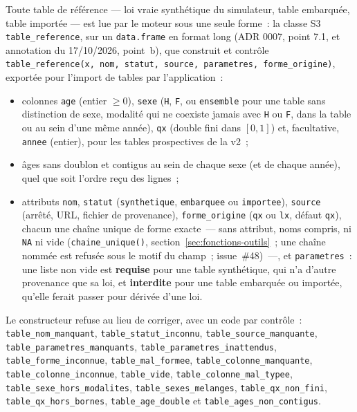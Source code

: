 \documentclass[a4paper,11pt]{article}
\newcommand{\code}[1]{\texttt{\small #1}}
\begin{document}
Toute table de référence --- loi vraie synthétique du simulateur, table
embarquée, table importée --- est lue par le moteur sous une seule forme~: la
classe S3 \code{table\_reference}, sur un \code{data.frame} en format long
(ADR 0007, point 7.1, et annotation du 17/10/2026, point~b), que construit et
contrôle \code{table\_reference(x, nom, statut, source, parametres,
forme\_origine)}, exportée pour l'import de tables par l'application~:

\begin{itemize}[leftmargin=*, itemsep=2pt]
  \item colonnes \code{age} (entier $\ge 0$), \code{sexe} (\code{H}, \code{F},
    ou \code{ensemble} pour une table sans distinction de sexe, modalité qui ne
    coexiste jamais avec \code{H} ou \code{F}, dans la table ou au sein d'une
    même année), \code{qx} (double fini dans $[0, 1]$) et, facultative,
    \code{annee} (entier), pour les tables prospectives de la v2~;
  \item âges sans doublon et contigus au sein de chaque sexe (et de chaque
    année), quel que soit l'ordre reçu des lignes~;
  \item attributs \code{nom}, \code{statut} (\code{synthetique},
    \code{embarquee} ou \code{importee}), \code{source} (arrêté, URL, fichier
    de provenance), \code{forme\_origine} (\code{qx} ou \code{lx}, défaut
    \code{qx}), chacun une chaîne unique de forme exacte~--- sans attribut,
    noms compris, ni \code{NA} ni vide (\code{chaine\_unique()},
    section~\ref{sec:fonctions-outils}~; une chaîne nommée est refusée sous le
    motif du champ~; issue~\#48)~---, et \code{parametres}~: une liste non vide est \textbf{requise}
    pour une table synthétique, qui n'a d'autre provenance que sa loi, et
    \textbf{interdite} pour une table embarquée ou importée, qu'elle ferait
    passer pour dérivée d'une loi.
\end{itemize}

\noindent
{\sloppy{} Le constructeur refuse au lieu de corriger, avec un code par contrôle~:
\code{table\_nom\_manquant}, \code{table\_statut\_inconnu},
\code{table\_source\_manquante}, \code{table\_parametres\_manquants},
\code{table\_parametres\_inattendus}, \code{table\_forme\_inconnue},
\code{table\_mal\_formee}, \code{table\_colonne\_manquante},
\code{table\_colonne\_inconnue}, \code{table\_vide},
\code{table\_colonne\_mal\_typee}, \code{table\_sexe\_hors\_modalites},
\code{table\_sexes\_melanges}, \code{table\_qx\_non\_fini},
\code{table\_qx\_hors\_bornes}, \code{table\_age\_double} et
\code{table\_ages\_non\_contigus}.\par}
\end{document}
